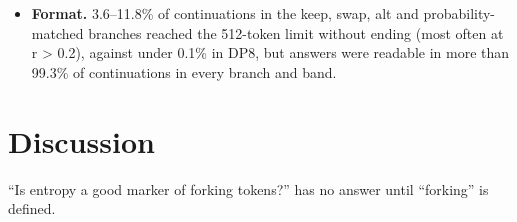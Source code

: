 \documentclass[
  10pt,
  a4paper,
]{article}
\begin{document}
\begin{itemize}
  entropy's AUROC was 0.493 for top \(e_{\tau}\) and 0.486 {[}0.403, 0.571{]} for top \(e\) (labels ranked among matched positions): the anti-alignment is not detectable in this half even for the
  runner-up swap, so the half says nothing about DP7's question. Our reading is that the matched half consists mostly of non-digit positions (the non-digit AUROC of the digit test was 0.485). On the
  same positions, \(e_{\tau} - e\) was +0.006 {[}−0.001, +0.014{]} (DP8: +0.030), and the digit odds ratio of DP7's third test was 3.77 {[}1.27, 13.6{]} (DP7: 48.8; label permutation control centred
  at 0.95).
\item
  \textbf{Format.} 3.6--11.8\% of continuations in the keep, swap, alt and probability-matched branches reached the 512-token limit without ending (most often at r \textgreater{} 0.2), against under
  0.1\% in DP8, but answers were readable in more than 99.3\% of continuations in every branch and band.
\end{itemize}

\hypertarget{discussion}{%
\section{Discussion}\label{discussion}}

``Is entropy a good marker of forking tokens?'' has no answer until ``forking'' is defined.
\end{document}
